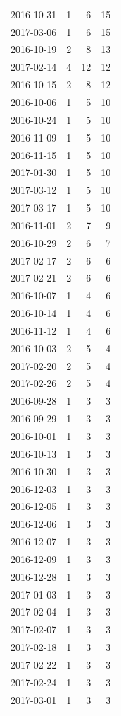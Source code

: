 \begin{tabular}{lrrr}
2016-10-31 & 1 & 6 & 15 \\
2017-03-06 & 1 & 6 & 15 \\
2016-10-19 & 2 & 8 & 13 \\
2017-02-14 & 4 & 12 & 12 \\
2016-10-15 & 2 & 8 & 12 \\
2016-10-06 & 1 & 5 & 10 \\
2016-10-24 & 1 & 5 & 10 \\
2016-11-09 & 1 & 5 & 10 \\
2016-11-15 & 1 & 5 & 10 \\
2017-01-30 & 1 & 5 & 10 \\
2017-03-12 & 1 & 5 & 10 \\
2017-03-17 & 1 & 5 & 10 \\
2016-11-01 & 2 & 7 & 9 \\
2016-10-29 & 2 & 6 & 7 \\
2017-02-17 & 2 & 6 & 6 \\
2017-02-21 & 2 & 6 & 6 \\
2016-10-07 & 1 & 4 & 6 \\
2016-10-14 & 1 & 4 & 6 \\
2016-11-12 & 1 & 4 & 6 \\
2016-10-03 & 2 & 5 & 4 \\
2017-02-20 & 2 & 5 & 4 \\
2017-02-26 & 2 & 5 & 4 \\
2016-09-28 & 1 & 3 & 3 \\
2016-09-29 & 1 & 3 & 3 \\
2016-10-01 & 1 & 3 & 3 \\
2016-10-13 & 1 & 3 & 3 \\
2016-10-30 & 1 & 3 & 3 \\
2016-12-03 & 1 & 3 & 3 \\
2016-12-05 & 1 & 3 & 3 \\
2016-12-06 & 1 & 3 & 3 \\
2016-12-07 & 1 & 3 & 3 \\
2016-12-09 & 1 & 3 & 3 \\
2016-12-28 & 1 & 3 & 3 \\
2017-01-03 & 1 & 3 & 3 \\
2017-02-04 & 1 & 3 & 3 \\
2017-02-07 & 1 & 3 & 3 \\
2017-02-18 & 1 & 3 & 3 \\
2017-02-22 & 1 & 3 & 3 \\
2017-02-24 & 1 & 3 & 3 \\
2017-03-01 & 1 & 3 & 3 \\

\end{tabular}
